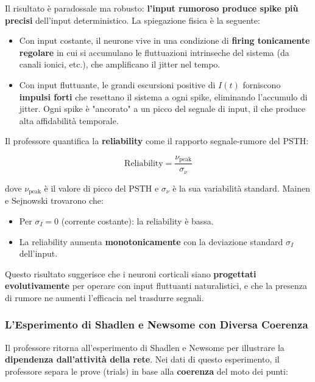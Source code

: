 Il risultato è paradossale ma robusto: \textbf{l'input rumoroso produce spike più precisi} dell'input deterministico. La spiegazione fisica è la seguente:
\begin{itemize}
    \item Con input costante, il neurone vive in una condizione di \textbf{firing tonicamente regolare} in cui si accumulano le fluttuazioni intrinseche del sistema (da canali ionici, etc.), che amplificano il jitter nel tempo.
    \item Con input fluttuante, le grandi escursioni positive di $I(t)$ forniscono \textbf{impulsi forti} che resettano il sistema a ogni spike, eliminando l'accumulo di jitter. Ogni spike è "ancorato" a un picco del segnale di input, il che produce alta affidabilità temporale.
\end{itemize}

Il professore quantifica la \textbf{reliability} come il rapporto segnale-rumore del PSTH:

\begin{equation}
\text{Reliability} = \frac{\nu_{\text{peak}}}{\sigma_{\nu}}
\end{equation}

dove $\nu_{\text{peak}}$ è il valore di picco del PSTH e $\sigma_{\nu}$ è la sua variabilità standard. Mainen e Sejnowski trovarono che:
\begin{itemize}
    \item Per $\sigma_I = 0$ (corrente costante): la reliability è bassa.
    \item La reliability aumenta \textbf{monotonicamente} con la deviazione standard $\sigma_I$ dell'input.
\end{itemize}

Questo risultato suggerisce che i neuroni corticali siano \textbf{progettati evolutivamente} per operare con input fluttuanti naturalistici, e che la presenza di rumore ne aumenti l'efficacia nel trasdurre segnali.



\subsubsection{L'Esperimento di Shadlen e Newsome con Diversa Coerenza}

Il professore ritorna all'esperimento di Shadlen e Newsome per illustrare la \textbf{dipendenza dall'attività della rete}. Nei dati di questo esperimento, il professore separa le prove (trials) in base alla \textbf{coerenza} del moto dei punti:

